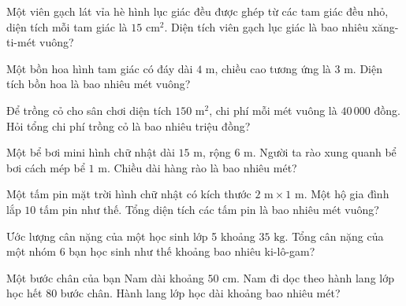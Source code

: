 \begin{ex}
  Một viên gạch lát vỉa hè hình lục giác đều được ghép từ các tam giác đều nhỏ, diện tích mỗi tam giác là $15\text{ cm}^2$. Diện tích viên gạch lục giác là bao nhiêu xăng-ti-mét vuông?
\end{ex}

\begin{ex}
  Một bồn hoa hình tam giác có đáy dài $4\text{ m}$, chiều cao tương ứng là $3\text{ m}$. Diện tích bồn hoa là bao nhiêu mét vuông?
\end{ex}

\begin{ex}
  Để trồng cỏ cho sân chơi diện tích $150\text{ m}^2$, chi phí mỗi mét vuông là $40\,000$ đồng. Hỏi tổng chi phí trồng cỏ là bao nhiêu triệu đồng?
\end{ex}

\begin{ex}
  Một bể bơi mini hình chữ nhật dài $15\text{ m}$, rộng $6\text{ m}$. Người ta rào xung quanh bể bơi cách mép bể $1\text{ m}$. Chiều dài hàng rào là bao nhiêu mét?
\end{ex}

\begin{ex}
  Một tấm pin mặt trời hình chữ nhật có kích thước $2\text{ m} \times 1\text{ m}$. Một hộ gia đình lắp $10$ tấm pin như thế. Tổng diện tích các tấm pin là bao nhiêu mét vuông?
\end{ex}

\begin{ex}
  Ước lượng cân nặng của một học sinh lớp 5 khoảng $35\text{ kg}$. Tổng cân nặng của một nhóm $6$ bạn học sinh như thế khoảng bao nhiêu ki-lô-gam?
\end{ex}

\begin{ex}
  Một bước chân của bạn Nam dài khoảng $50\text{ cm}$. Nam đi dọc theo hành lang lớp học hết $80$ bước chân. Hành lang lớp học dài khoảng bao nhiêu mét?
\end{ex}


